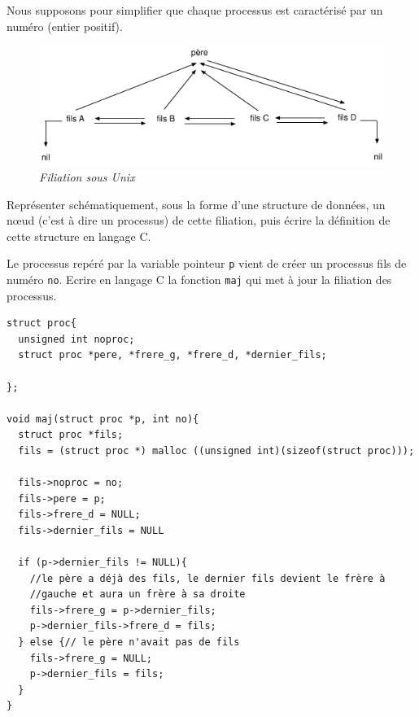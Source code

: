 \documentclass[10pt]{article}\usepackage[nu]{esial}
\begin{document}
Nous supposons pour simplifier que chaque processus est caractérisé
par un numéro (entier positif).


\bigskip\bigskip
\begin{figure}[h]
  \centerline{\includegraphics[width=\linewidth]{filiation.pdf}}
  \caption[]
	  {{\it Filiation sous Unix}}
	  \label{filiation}
\end{figure}
\bigskip

\Question  Représenter schématiquement, sous la
forme d'une structure de données, un n\oe ud (c'est à dire un
processus) de cette filiation, puis écrire la définition de cette
structure en langage C.

\Question  Le processus repéré par la variable
pointeur {\tt p} vient de créer un processus fils de numéro {\tt no}.
Ecrire en langage C la fonction {\tt maj} qui met à jour la filiation
des processus.

\begin{Reponse}
\vspace{-.7cm}
\begin{verbatim}
struct proc{
  unsigned int noproc;
  struct proc *pere, *frere_g, *frere_d, *dernier_fils;
  
};

void maj(struct proc *p, int no){
  struct proc *fils;
  fils = (struct proc *) malloc ((unsigned int)(sizeof(struct proc)));

  fils->noproc = no;
  fils->pere = p;
  fils->frere_d = NULL;
  fils->dernier_fils = NULL 

  if (p->dernier_fils != NULL){
    //le père a déjà des fils, le dernier fils devient le frère à
    //gauche et aura un frère à sa droite
    fils->frere_g = p->dernier_fils;
    p->dernier_fils->frere_d = fils;
  } else {// le père n'avait pas de fils
    fils->frere_g = NULL;
    p->dernier_fils = fils;
  } 
}
\end{verbatim}
~
\end{Reponse}
\end{document}
